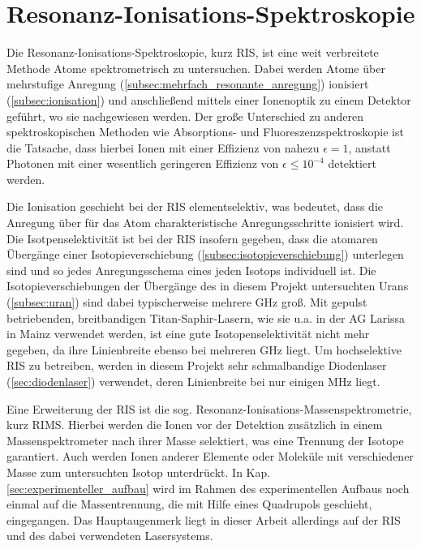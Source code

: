 \section{Resonanz-Ionisations-Spektroskopie}\label{sec:ris}
Die Resonanz-Ionisations-Spektroskopie, kurz RIS, ist eine weit verbreitete
Methode Atome spektrometrisch zu untersuchen. Dabei werden Atome über
mehrstufige Anregung (\ref{subsec:mehrfach_resonante_anregung})
ionisiert (\ref{subsec:ionisation}) und anschließend mittels
einer Ionenoptik zu einem Detektor geführt, wo sie nachgewiesen werden. Der große Unterschied zu anderen spektroskopischen Methoden wie Absorptions- und Fluoreszenzspektroskopie ist die
Tatsache, dass hierbei Ionen mit einer Effizienz von nahezu $\epsilon=1$,
anstatt Photonen mit einer wesentlich geringeren Effizienz von
$\epsilon\leq10^{-4}$ detektiert werden.\par
Die Ionisation geschieht bei der RIS elementselektiv, was bedeutet, dass die
Anregung über für das Atom charakteristische Anregungsschritte ionisiert wird.
Die Isotpenselektivität ist bei der RIS insofern gegeben, dass die atomaren
Übergänge einer Isotopieverschiebung (\ref{subsec:isotopieverschiebung})
unterlegen sind und so jedes Anregungsschema eines jeden Isotops individuell
ist. Die Isotopieverschiebungen der Übergänge des in diesem Projekt
untersuchten Urans (\ref{subsec:uran}) sind dabei typischerweise mehrere
GHz groß. Mit gepulst betriebenden, breitbandigen
Titan-Saphir-Lasern, wie sie u.a. in der AG Larissa in Mainz verwendet werden,
ist eine gute Isotopenselektivität nicht mehr gegeben, da ihre Linienbreite
ebenso bei mehreren GHz liegt. Um hochselektive RIS zu betreiben,
werden in diesem Projekt sehr schmalbandige Diodenlaser
(\ref{sec:diodenlaser}) verwendet, deren Linienbreite bei nur einigen
MHz liegt.\par
Eine Erweiterung der RIS ist die sog. Resonanz-Ionisations-Massenspektrometrie,
kurz RIMS. Hierbei werden die Ionen vor der Detektion zusätzlich in einem
Massenspektrometer nach ihrer Masse selektiert, was eine Trennung der Isotope
garantiert. Auch werden Ionen anderer Elemente oder Moleküle mit verschiedener
Masse zum untersuchten Isotop unterdrückt. In Kap.
\ref{sec:experimenteller_aufbau} wird im Rahmen des experimentellen Aufbaus noch
einmal auf die Massentrennung, die mit Hilfe eines Quadrupols geschieht,
eingegangen. Das Hauptaugenmerk liegt in dieser Arbeit allerdings auf der RIS
und des dabei verwendeten Lasersystems.

